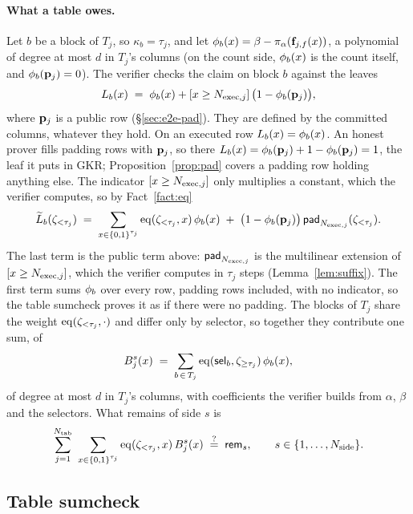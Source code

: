 \paragraph{What a table owes.} Let $b$ be a block of $T_j$, so $\kappa_b=\tau_j$, and let $\phi_{b}(x)=\beta-\pi_\alpha(\mathbf{f}_{j,f}(x))$, a polynomial of degree at most $d$ in $T_j$'s columns (on the count side, $\phi_{b}(x)$ is the count itself, and $\phi_{b}(\mathbf{p}_{j})=0$). The verifier checks the claim on block $b$ against the leaves
\[
  L_b(x)\;=\;\phi_{b}(x)+[x\ge N_{\mathrm{exec},j}]\,\bigl(1-\phi_{b}(\mathbf{p}_{j})\bigr),
\]
where $\mathbf{p}_{j}$ is a public row (\S\ref{sec:e2e-pad}). They are defined by the committed columns, whatever they hold. On an executed row $L_b(x)=\phi_{b}(x)$. An honest prover fills padding rows with $\mathbf{p}_{j}$, so there $L_b(x)=\phi_{b}(\mathbf{p}_{j})+1-\phi_{b}(\mathbf{p}_{j})=1$, the leaf it puts in GKR; Proposition~\ref{prop:pad} covers a padding row holding anything else. The indicator $[x\ge N_{\mathrm{exec},j}]$ only multiplies a constant, which the verifier computes, so by Fact~\ref{fact:eq}
\begin{equation}\label{eq:pad_leaf}
  \widetilde L_b(\zeta_{<\tau_j})\;=\;\sum_{x\in\{0,1\}^{\tau_j}}\operatorname{eq}(\zeta_{<\tau_j},x)\,\phi_{b}(x)\;+\;\bigl(1-\phi_{b}(\mathbf{p}_{j})\bigr)\,\mathsf{pad}_{N_{\mathrm{exec},j}}(\zeta_{<\tau_j}).
\end{equation}
The last term is the public term above: $\mathsf{pad}_{N_{\mathrm{exec},j}}$ is the multilinear extension of $[x\ge N_{\mathrm{exec},j}]$, which the verifier computes in $\tau_j$ steps (Lemma~\ref{lem:suffix}). The first term sums $\phi_{b}$ over every row, padding rows included, with no indicator, so the table sumcheck proves it as if there were no padding. The blocks of $T_j$ share the weight $\operatorname{eq}(\zeta_{<\tau_j},\cdot)$ and differ only by selector, so together they contribute one sum, of
\begin{equation}\label{eq:bus_poly}
  B^{s}_j(x)\;=\;\sum_{b\,\in\,T_j}\operatorname{eq}(\mathsf{sel}_b,\zeta_{\ge\tau_j})\,\phi_{b}(x),
\end{equation}
of degree at most $d$ in $T_j$'s columns, with coefficients the verifier builds from $\alpha$, $\beta$ and the selectors. What remains of side $s$ is
\begin{equation}\label{eq:bus}
  \sum_{j=1}^{\ntab}\ \sum_{x\in\cube{\tau_j}}\eq(\zeta_{<\tau_j},x)\,B^{s}_j(x)\;\qeq\;\mathsf{rem}_{s},
  \qquad s\in\{1,\dots,\nside\}.
\end{equation}

\subsection{Table sumcheck}\label{sec:air}

